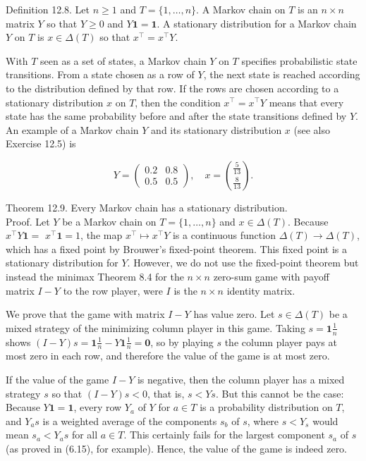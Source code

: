 \documentclass[12pt]{article}
\begin{document}
Definition 12.8. Let $n \geq 1$ and $T=\{1, \ldots, n\}$. A Markov chain on $T$ is an $n \times n$ matrix $Y$ so that $Y \geq 0$ and $Y \mathbf{1}=\mathbf{1}$. A stationary distribution for a Markov chain $Y$ on $T$ is $x \in \Delta(T)$ so that $x^{\top}=x^{\top} Y$.

With $T$ seen as a set of states, a Markov chain $Y$ on $T$ specifies probabilistic state transitions. From a state chosen as a row of $Y$, the next state is reached according to the distribution defined by that row. If the rows are chosen according to a stationary distribution $x$ on $T$, then the condition $x^{\top}=x^{\top} Y$ means that every state has the same probability before and after the state transitions defined by $Y$. An example of a Markov chain $Y$ and its stationary distribution $x$ (see also Exercise 12.5) is

$$
Y=\left(\begin{array}{ll}
0.2 & 0.8 \\
0.5 & 0.5
\end{array}\right), \quad x=\binom{\frac{5}{13}}{\frac{8}{13}} .
$$

Theorem 12.9. Every Markov chain has a stationary distribution.\\
Proof. Let $Y$ be a Markov chain on $T=\{1, \ldots, n\}$ and $x \in \Delta(T)$. Because $x^{\top} Y \mathbf{1}=$ $x^{\top} \mathbf{1}=1$, the map $x^{\top} \mapsto x^{\top} Y$ is a continuous function $\Delta(T) \rightarrow \Delta(T)$, which has a fixed point by Brouwer's fixed-point theorem. This fixed point is a stationary distribution for $Y$. However, we do not use the fixed-point theorem but instead the minimax Theorem 8.4 for the $n \times n$ zero-sum game with payoff matrix $I-Y$ to the row player, were $I$ is the $n \times n$ identity matrix.

We prove that the game with matrix $I-Y$ has value zero. Let $s \in \Delta(T)$ be a mixed strategy of the minimizing column player in this game. Taking $s=\mathbf{1} \frac{1}{n}$ shows $(I-Y) s=\mathbf{1} \frac{1}{n}-Y \mathbf{1} \frac{1}{n}=\mathbf{0}$, so by playing $s$ the column player pays at most zero in each row, and therefore the value of the game is at most zero.

If the value of the game $I-Y$ is negative, then the column player has a mixed strategy $s$ so that $(I-Y) s<0$, that is, $s<Y s$. But this cannot be the case: Because $Y \mathbf{1}=\mathbf{1}$, every row $Y_{a}$ of $Y$ for $a \in T$ is a probability distribution on $T$, and $Y_{a} s$ is a weighted average of the components $s_{b}$ of $s$, where $s<Y_{s}$ would mean $s_{a}<Y_{a} s$ for all $a \in T$. This certainly fails for the largest component $s_{a}$ of $s$ (as proved in (6.15), for example). Hence, the value of the game is indeed zero.
\end{document}
